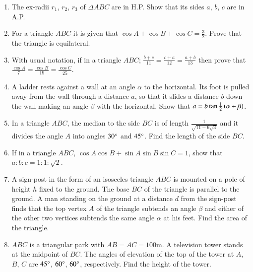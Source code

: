 \documentclass[journal,12pt,twocolumn]{IEEEtran}
\theoremstyle{remark}
\begin{document}
\begin{enumerate}
\hfill{}

\item The ex-radii $r_1$, $r_2$, $r_3$ of $\Delta ABC$ are in H.P. Show that its sides $a$, $b$, $c$ are in A.P.

\hfill{} 

\item For a triangle $ABC$ it is given that $\cos{A}+\cos{B}+\cos{C}=\frac{3}{2}$. Prove that the triangle is equilateral. 

\hfill{}

\item With usual notation, if in a triangle $ABC$; $\frac{b+c}{11}=\frac{c+a}{12}=\frac{a+b}{13}$ then prove that $\frac{\cos{A}}{7}=\frac{\cos{B}}{19}=\frac{\cos{C}}{25}$. 

\hfill{}

\item A ladder rests against a wall at an angle $\alpha$ to the horizontal. Its foot is pulled away from the wall through a distance $a$, so that it slides a distance $b$ down the wall making an angle $\beta$ with the horizontal. Show that $a=b\tan{\frac{1}{2}\ensuremath{\left(\alpha+\beta\right)}}$.

\hfill{}

\item In a triangle $ABC$, the median to the side $BC$ is of length $\frac{1}{\sqrt{11-6\sqrt{3}}}$ and it divides the angle $A$ into angles $30\degree$ and $45\degree$. Find the length of the side $BC$.

\hfill{}

\item If in a triangle $ABC$, $\cos{A}\cos{B}+\sin{A}\sin{B}\sin{C}=1$, show that $a:b:c=1:1:\sqrt{2}$.

\hfill{}

\item A sign-post in the form of an isosceles triangle $ABC$ is mounted on a pole of height $h$ fixed to the ground. The base $BC$ of the triangle is parallel to the ground. A man standing on the ground at a distance $d$ from the sign-post finds that the top vertex $A$ of the triangle subtends an angle $\beta$ and either of the other two vertices subtends the same angle $\alpha$ at his feet. Find the area of the triangle. 

\hfill{}

\item $ABC$ is a triangular park with $AB=AC=100$m. A television tower stands at the midpoint of $BC$. The angles of elevation of the top of the tower at $A$, $B$, $C$ are $45\degree$, $60\degree$, $60\degree$, respectively. Find the height of the tower. 


\end{enumerate}
\end{document}
